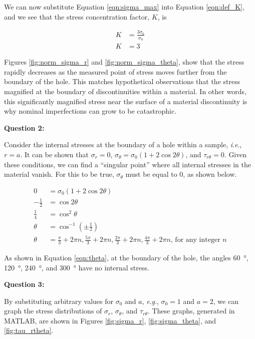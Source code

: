 \documentclass[12 pt]{article}
\newcommand{\ie}{\textit{i}.\textit{e}., }
\newcommand{\eg}{\textit{e}.\textit{g}., }
\begin{document}
We can now substitute Equation \ref{eqn:sigma_max} into Equation \ref{eqn:def_K}, and we see that the stress concentration factor, $K$, is

\begin{align}
K&=\frac{3\sigma_0}{\sigma_0} \\
K&=3
\end{align}

Figures \ref{fig:norm_sigma_r} and \ref{fig:norm_sigma_theta}, show that the stress rapidly decreases as the measured point of stress moves further from the boundary of the hole. This matches hypothetical observations that the stress magnified at the boundary of discontinuities within a material. In other words, this significantly magnified stress near the surface of a material discontinuity is why nominal imperfections can grow to be catastrophic.

\textbf{Question 2:}

Consider the internal stresses at the boundary of a hole within a sample, \ie $r=a$. It can be shown that $\sigma_r=0$, $\sigma_\theta=\sigma_0\left(1+2\cos2\theta\right)$, and $\tau_{r\theta}=0$. Given these conditions, we can find a ``singular point'' where all internal stresses in the material vanish. For this to be true, $\sigma_\theta$ must be equal to \num{0}, as shown below.

\begin{align}
0&=\sigma_0\left(1+2\cos2\theta\right) \\
-\frac{1}{2}&=\cos2\theta \\
\frac{1}{4}&=\cos^2\theta \\
\theta&=\cos^{-1}\left({\pm\frac{1}{2}}\right) \\
\theta&=\frac{\pi}{3}+2{\pi}n,\frac{5\pi}{3}+2{\pi}n,\frac{2\pi}{3}+2{\pi}n,\frac{4\pi}{3}+2{\pi}n\text{, for any integer }n \label{eqn:theta}
\end{align}

As shown in Equation \ref{eqn:theta}, at the boundary of the hole, the angles \qty{60}{\degree}, \qty{120}{\degree}, \qty{240}{\degree}, and \qty{300}{\degree} have no internal stress.

\textbf{Question 3:}

By substituting arbitrary values for $\sigma_0$ and $a$, \eg $\sigma_0=1$ and $a=2$, we can graph the stress distributions of $\sigma_r$, $\sigma_\theta$, and $\tau_{r\theta}$. These graphs, generated in MATLAB, are shown in Figures \ref{fig:sigma_r}, \ref{fig:sigma_theta}, and \ref{fig:tau_rtheta}.
\end{document}

